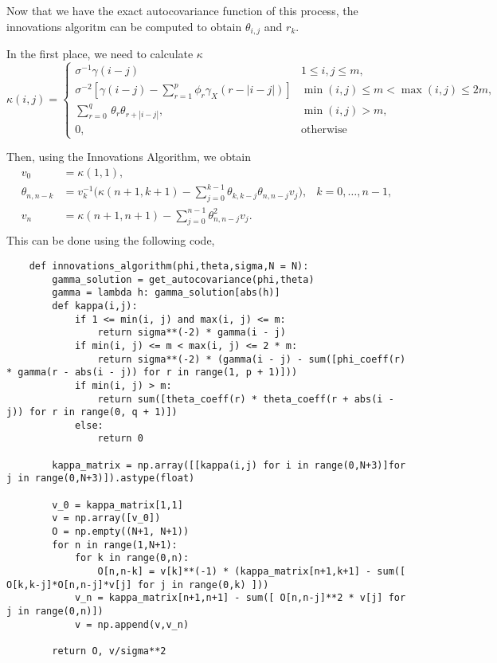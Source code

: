 Now that we have the exact autocovariance function of this process, the innovations algoritm can be computed to obtain $\theta_{i,j}$ and $r_k$. 

In the first place, we need to calculate $\kappa$
\[ \kappa(i,j) = \begin{cases}
    \sigma^{-1} \gamma(i-j) & 1 \leq i,j \leq m,\\
    \sigma^{-2}\left[\gamma(i-j)-\sum_{r=1}^{p}\phi_{r}\gamma_{X}(r-|i-j|)\right] & \min(i,j)\leq m<\max(i,j)\leq 2m,\\
    \sum_{r=0}^{q}\,\theta_{r}\theta_{r+|i-j|}, & \min(i,j) > m,\\
    0, & \mbox{otherwise}
\end{cases} \]

Then, using the Innovations Algorithm, we obtain
\[ \begin{aligned} 
    v_0 & =\kappa( 1, 1 ), \\ 
    {\theta_{n, n-k}} & = v_{k}^{-1} \bigg( \kappa( n+1, k+1 )-\sum_{j=0}^{k-1} \theta_{k, k-j} \theta_{n, n-j} v_{j} \bigg), & k = 0,\ldots, n-1, \\
     {v_{n}} & =\kappa( n+1, n+1 )-\sum_{j=0}^{n-1} \theta_{n, n-j}^{2} v_{j}. \\ \end{aligned}
\]
This can be done using the following code,
\begin{verbatim}
    def innovations_algorithm(phi,theta,sigma,N = N):        
        gamma_solution = get_autocovariance(phi,theta)
        gamma = lambda h: gamma_solution[abs(h)]
        def kappa(i,j):
            if 1 <= min(i, j) and max(i, j) <= m:
                return sigma**(-2) * gamma(i - j)
            if min(i, j) <= m < max(i, j) <= 2 * m:
                return sigma**(-2) * (gamma(i - j) - sum([phi_coeff(r) * gamma(r - abs(i - j)) for r in range(1, p + 1)]))
            if min(i, j) > m:
                return sum([theta_coeff(r) * theta_coeff(r + abs(i - j)) for r in range(0, q + 1)])
            else:
                return 0

        kappa_matrix = np.array([[kappa(i,j) for i in range(0,N+3)]for j in range(0,N+3)]).astype(float)

        v_0 = kappa_matrix[1,1]
        v = np.array([v_0])
        O = np.empty((N+1, N+1))
        for n in range(1,N+1):
            for k in range(0,n):
                O[n,n-k] = v[k]**(-1) * (kappa_matrix[n+1,k+1] - sum([ O[k,k-j]*O[n,n-j]*v[j] for j in range(0,k) ]))
            v_n = kappa_matrix[n+1,n+1] - sum([ O[n,n-j]**2 * v[j] for j in range(0,n)])
            v = np.append(v,v_n)

        return O, v/sigma**2
\end{verbatim}

